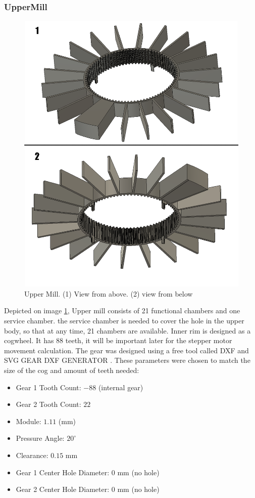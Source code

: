 \subsubsection{UpperMill}
\begin{figure}[h]
	\centering
	\includegraphics[width=0.6\linewidth]{Figures/Uppermill}
	\caption[Upper Mill]{Upper Mill. (1) View from above. (2) view from below}
	\label{fig:uppermill}
\end{figure}
Depicted on image \ref{fig:uppermill}, Upper mill consists of 21 functional chambers and one service chamber. the service chamber is needed to cover the hole in the upper body, so that at any time, 21 chambers are available. Inner rim is designed as a  cogwheel. It has 88 teeth, it will be important later for the stepper motor movement calculation. The gear was designed using a free tool called DXF and SVG GEAR DXF GENERATOR \cite{evolvent_spur_gear_generator}.
These parameters were chosen to match the size of the cog and amount of teeth needed: 
\begin{itemize}
	\item Gear 1 Tooth Count: $-88$ (internal gear)
	\item Gear 2 Tooth Count: $22$
	\item Module: $1.11$ (mm)
	\item Pressure Angle: $20^\circ$
	\item Clearance: $0.15$ mm
	\item Gear 1 Center Hole Diameter: $0$ mm (no hole)
	\item Gear 2 Center Hole Diameter: $0$ mm (no hole)
\end{itemize}

